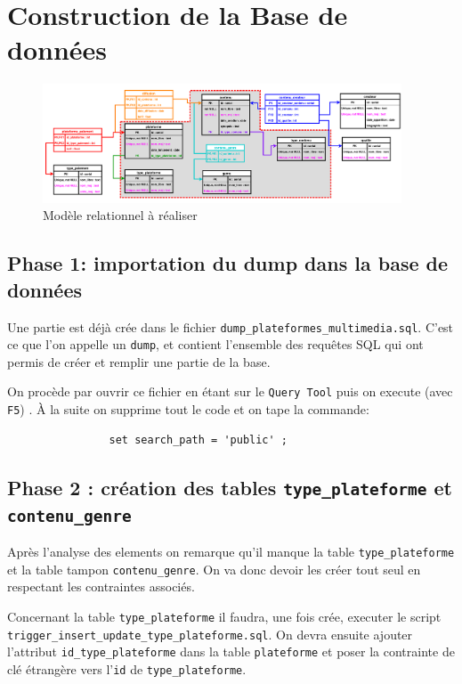 \documentclass[11pt, openright]{book}
\begin{document}
\section{Construction de la Base de données}

\begin{figure}[ht!]
	\centering
	\includegraphics[width=0.95\textwidth]{./object/g1.png}
	\caption{Modèle relationnel à réaliser}
\end{figure}

\subsection{Phase 1: importation du dump dans la base de données}

Une partie est déjà crée dans le fichier \texttt{dump\_plateformes\_multimedia.sql}. C'est ce que l'on appelle un \texttt{dump}, et contient l'ensemble des requêtes SQL qui ont permis de créer et remplir une partie de la base.

On procède par ouvrir ce fichier en étant sur le \texttt{Query Tool} puis on execute (avec \texttt{F5}) . À la suite on supprime tout le code et on tape la commande:
\begin{lstlisting}
				set search_path = 'public' ;
			\end{lstlisting}

\subsection{Phase 2 : création des tables \texttt{type\_plateforme} et \texttt{contenu\_genre}}

Après l'analyse des elements on remarque qu'il manque la table \texttt{type\_plateforme} et la table tampon \texttt{contenu\_genre}. On va donc devoir les créer tout seul en respectant les contraintes associés.

Concernant la table \texttt{type\_plateforme} il faudra, une fois crée, executer le script \texttt{trigger\_insert\_update\_type\_plateforme.sql}. On devra ensuite ajouter l'attribut \texttt{id\_type\_plateforme} dans la table \texttt{plateforme} et poser la contrainte de clé étrangère vers l'\texttt{id} de \texttt{type\_plateforme}.
\end{document}
